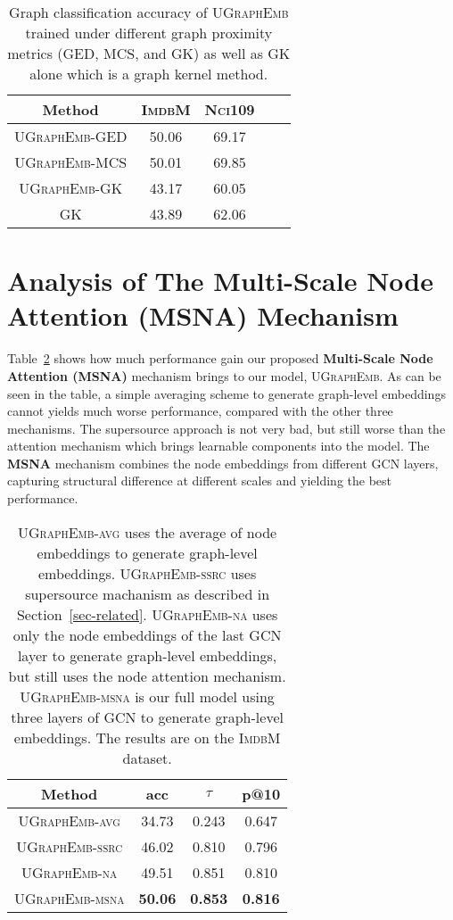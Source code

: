 \documentclass{article}
\newcommand{\model}{\textsc{UGraphEmb}\xspace}
\newcommand{\imdb}{\textsc{ImdbM}\xspace}
\newcommand{\nci}{\textsc{Nci109}\xspace}
\begin{document}
\begin{table}
\begin{tabular}
{ccccc} \hline
\textbf{Method} & \textbf{\imdb} & \textbf{\nci} \\ \hline
\model-GED & 50.06 & 69.17 \\
\model-MCS & 50.01 & 69.85 \\
\model-\textsc{GK} & 43.17 & 60.05 \\
\textsc{GK} & 43.89 & 62.06 \\
\hline
\end{tabular}
\centering
\caption{Graph classification accuracy of \model trained under different graph proximity metrics (GED, MCS, and \textsc{GK}) as well as \textsc{GK} alone which is a graph kernel method.}
\label{table:metric_result}
\end{table}





 \section{Analysis of The \textbf{Multi-Scale Node Attention (MSNA)} Mechanism}
\label{sec-msna}

Table~\ref{table:msna} shows how much performance gain our proposed \textbf{Multi-Scale Node Attention (MSNA)} mechanism brings to our model, \model. As can be seen in the table, a simple averaging scheme to generate graph-level embeddings cannot yields much worse performance, compared with the other three mechanisms. The supersource approach is not very bad, but still worse than the attention mechanism which brings learnable components into the model. The \textbf{MSNA} mechanism combines the node embeddings from different GCN layers, capturing structural difference at different scales and yielding the best performance.

\begin{table}
\begin{tabular}
{cccc} \hline
\textbf{Method} & \textbf{acc} & \textbf{$\tau$} & \textbf{p@10} \\ \hline
\textsc{\model}-\textsc{avg} & 34.73 & 0.243 & 0.647 \\
\textsc{\model}-\textsc{ssrc} & 46.02 & 0.810 & 0.796 \\
\textsc{\model}-\textsc{na} & 49.51 & 0.851 & 0.810 \\
\textsc{\model}-\textsc{msna} & \textbf{50.06} & \textbf{0.853} & \textbf{0.816} \\
\hline
\end{tabular}
\centering
\caption{\textsc{\model}-\textsc{avg} uses the average of node embeddings to generate graph-level embeddings. \textsc{\model}-\textsc{ssrc} uses supersource machanism as described in Section~\ref{sec-related}. \textsc{\model}-\textsc{na} uses only the node embeddings of the last GCN layer to generate graph-level embeddings, but still uses the node attention mechanism. \textsc{\model}-\textsc{msna} is our full model using three layers of GCN to generate graph-level embeddings. The results are on the \imdb dataset.}
\label{table:msna}
\end{table}
\end{document}
